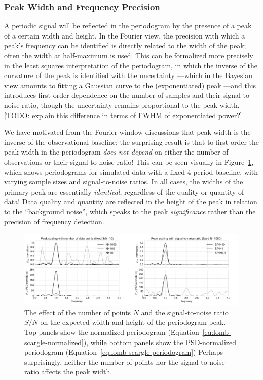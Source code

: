 \documentclass[preprint]{aastex}
\newcommand{\todo}[1]{{\color{red} [TODO: #1]}}
\newcommand{\fig}[1]{Figure~\ref{fig:#1}}
\newcommand{\figlabel}[1]{\label{fig:#1}}
\newcommand{\Eq}[1]{Equation~\ref{eq:#1}}
\newcommand{\eq}[1]{\Eq{#1}}
\begin{document}
\subsubsection{Peak Width and Frequency Precision}

A periodic signal will be reflected in the periodogram by the presence of a
peak of a certain width and height.
In the Fourier view, the precision with which a peak's frequency can be
identified is directly related to the width of the peak; often the
width at half-maximum is used.
This can be formalized more precisely in the least squares interpretation of
the periodogram, in which the inverse of the curvature of the peak is
identified with the uncertainty \citep{ICVG2014}---which in the Bayesian
view amounts to fitting a Gaussian curve to the (exponentiated)
peak \citep{Jaynes87, Bretthorst88}---and this introduces first-order
dependence on the number of samples and their signal-to-noise ratio,
though the uncertainty remains proportional to the peak width.
\todo{explain this difference in terms of FWHM of exponentiated power?}

We have motivated from the Fourier window discussions that peak width is
the inverse of the observational baseline; the surprising result is that to
first order the peak width in the periodogram {\it does not depend} on
either the number of observations or their signal-to-noise ratio!
This can be seen visually in \fig{peak-width-height},
which shows periodograms for simulated data with a fixed 4-period baseline,
with varying sample sizes and signal-to-noise ratios.
In all cases, the widths of the primary peak are essentially {\it identical},
regardless of the quality or quantity of data!
Data quality and quantity are reflected in the height of the peak in relation
to the ``background noise'', which speaks to the peak {\it significance} rather
than the precision of frequency detection.

\begin{figure}[ht]
  \centering
  \includegraphics[width=\textwidth]{fig26_peak_width_height}
  \caption{The effect of the number of points $N$ and the signal-to-noise
    ratio $S/N$ on the expected width and height of the periodogram peak.
    Top panels show the normalized periodogram (\eq{lomb-scargle-normalized}),
    while bottom panels show the PSD-normalized periodogram
    (\eq{lomb-scargle-periodogram})
    Perhaps surprisingly, neither the number of points nor the signal-to-noise
    ratio affects the peak width. \figlabel{peak-width-height}}
\end{figure}
\end{document}
